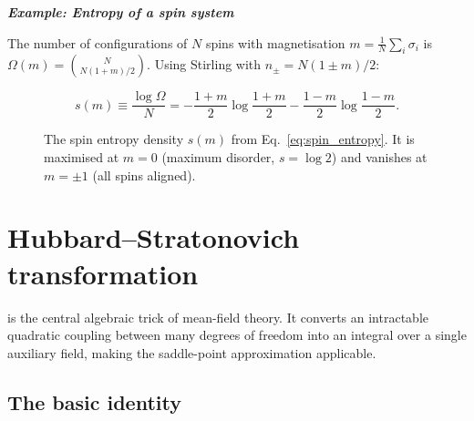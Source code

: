 \documentclass[justified,notoc]{tufte-handout}
\begin{document}
\noindent\textit{\textbf{Example: Entropy of a spin system}}\quad

The number of configurations of $N$ spins with magnetisation $m=\frac{1}{N}\sum_i\sigma_i$ is $\Omega(m)=\binom{N}{N(1+m)/2}$. Using Stirling with $n_\pm=N(1\pm m)/2$:
\begin{keyresult}
\begin{equation}
  s(m)\equiv\frac{\log\Omega}{N}=-\frac{1+m}{2}\log\frac{1+m}{2}-\frac{1-m}{2}\log\frac{1-m}{2}.
  \label{eq:spin_entropy}
\end{equation}
\end{keyresult}

\begin{figure}
\centering
{}
\caption{The spin entropy density $s(m)$ from Eq.~\eqref{eq:spin_entropy}. It is maximised at $m=0$ (maximum disorder, $s=\log 2$) and vanishes at $m=\pm 1$ (all spins aligned).}
\label{fig:spin_entropy}
\end{figure}

\section{Hubbard--Stratonovich transformation}
\label{sec:HS}

 is the central algebraic trick of mean-field theory. It converts an intractable quadratic coupling between many degrees of freedom into an integral over a single auxiliary field, making the saddle-point approximation applicable.

\subsection{The basic identity}
\end{document}
